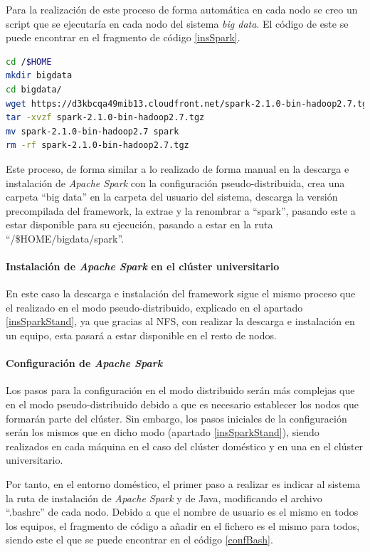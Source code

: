 Para la realización de este proceso de forma automática en cada nodo se creo un script que se ejecutaría en cada nodo del sistema \textit{big data}. El código de este se puede encontrar en el fragmento de código \ref{insSpark}.

\begin{lstlisting}[label=insSpark,language=sh,frame=single,caption=Script de instalación de \textit{Apache Spark} en los nodos del clúster doméstico]
cd /$HOME
mkdir bigdata
cd bigdata/
wget https://d3kbcqa49mib13.cloudfront.net/spark-2.1.0-bin-hadoop2.7.tgz
tar -xvzf spark-2.1.0-bin-hadoop2.7.tgz
mv spark-2.1.0-bin-hadoop2.7 spark
rm -rf spark-2.1.0-bin-hadoop2.7.tgz
\end{lstlisting}

Este proceso, de forma similar a lo realizado de forma manual en la descarga e instalación de \textit{Apache Spark} con la configuración pseudo-distribuida, crea una carpeta ``big data'' en la carpeta del usuario del sistema, descarga la versión precompilada del \gls{framework}, la extrae y la renombrar a ``spark'', pasando este a estar disponible para su ejecución, pasando a estar en la ruta ``/\$HOME/bigdata/spark''.

\clearpage
\paragraph{Instalación de \textit{Apache Spark} en el clúster universitario}
En este caso la descarga e instalación del \gls{framework} sigue el mismo proceso que el realizado en el modo pseudo-distribuido, explicado en el apartado \ref{insSparkStand}, ya que gracias al \gls{NFS}, con realizar la descarga e instalación en un equipo, esta pasará a estar disponible en el resto de nodos.

\paragraph{Configuración de \textit{Apache Spark}}
Los pasos para la configuración en el modo distribuido serán más complejas que en el modo pseudo-distribuido debido a que es necesario establecer los nodos que formarán parte del clúster. Sin embargo, los pasos iniciales de la configuración serán los mismos que en dicho modo (apartado \ref{insSparkStand}), siendo realizados en cada máquina en el caso del clúster doméstico y en una en el clúster universitario.
 
Por tanto, en el entorno doméstico, el primer paso a realizar es indicar al sistema la ruta de instalación de \textit{Apache Spark} y de Java, modificando el archivo ``.bashrc'' de cada nodo. Debido a que el nombre de usuario es el mismo en todos los equipos, el fragmento de código a añadir en el fichero es el mismo para todos, siendo este el que se puede encontrar en el código \ref{confBash}.

